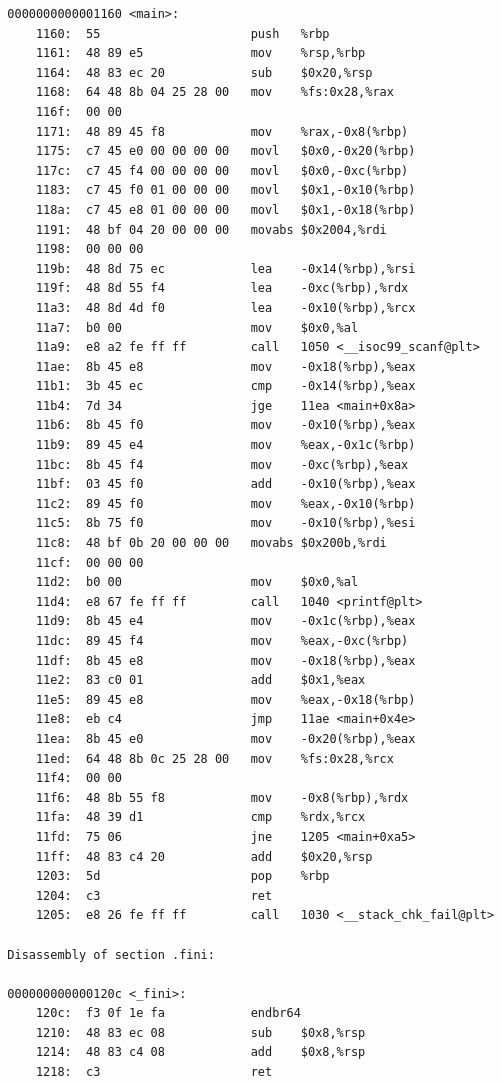 \documentclass[UTF8,a4paper,10pt]{ctexart}
\begin{document}
\begin{verbatim}
  0000000000001160 <main>:
      1160:  55                     push   %rbp
      1161:  48 89 e5               mov    %rsp,%rbp
      1164:  48 83 ec 20            sub    $0x20,%rsp
      1168:  64 48 8b 04 25 28 00   mov    %fs:0x28,%rax
      116f:  00 00 
      1171:  48 89 45 f8            mov    %rax,-0x8(%rbp)
      1175:  c7 45 e0 00 00 00 00   movl   $0x0,-0x20(%rbp)
      117c:  c7 45 f4 00 00 00 00   movl   $0x0,-0xc(%rbp)
      1183:  c7 45 f0 01 00 00 00   movl   $0x1,-0x10(%rbp)
      118a:  c7 45 e8 01 00 00 00   movl   $0x1,-0x18(%rbp)
      1191:  48 bf 04 20 00 00 00   movabs $0x2004,%rdi
      1198:  00 00 00 
      119b:  48 8d 75 ec            lea    -0x14(%rbp),%rsi
      119f:  48 8d 55 f4            lea    -0xc(%rbp),%rdx
      11a3:  48 8d 4d f0            lea    -0x10(%rbp),%rcx
      11a7:  b0 00                  mov    $0x0,%al
      11a9:  e8 a2 fe ff ff         call   1050 <__isoc99_scanf@plt>
      11ae:  8b 45 e8               mov    -0x18(%rbp),%eax
      11b1:  3b 45 ec               cmp    -0x14(%rbp),%eax
      11b4:  7d 34                  jge    11ea <main+0x8a>
      11b6:  8b 45 f0               mov    -0x10(%rbp),%eax
      11b9:  89 45 e4               mov    %eax,-0x1c(%rbp)
      11bc:  8b 45 f4               mov    -0xc(%rbp),%eax
      11bf:  03 45 f0               add    -0x10(%rbp),%eax
      11c2:  89 45 f0               mov    %eax,-0x10(%rbp)
      11c5:  8b 75 f0               mov    -0x10(%rbp),%esi
      11c8:  48 bf 0b 20 00 00 00   movabs $0x200b,%rdi
      11cf:  00 00 00 
      11d2:  b0 00                  mov    $0x0,%al
      11d4:  e8 67 fe ff ff         call   1040 <printf@plt>
      11d9:  8b 45 e4               mov    -0x1c(%rbp),%eax
      11dc:  89 45 f4               mov    %eax,-0xc(%rbp)
      11df:  8b 45 e8               mov    -0x18(%rbp),%eax
      11e2:  83 c0 01               add    $0x1,%eax
      11e5:  89 45 e8               mov    %eax,-0x18(%rbp)
      11e8:  eb c4                  jmp    11ae <main+0x4e>
      11ea:  8b 45 e0               mov    -0x20(%rbp),%eax
      11ed:  64 48 8b 0c 25 28 00   mov    %fs:0x28,%rcx
      11f4:  00 00 
      11f6:  48 8b 55 f8            mov    -0x8(%rbp),%rdx
      11fa:  48 39 d1               cmp    %rdx,%rcx
      11fd:  75 06                  jne    1205 <main+0xa5>
      11ff:  48 83 c4 20            add    $0x20,%rsp
      1203:  5d                     pop    %rbp
      1204:  c3                     ret
      1205:  e8 26 fe ff ff         call   1030 <__stack_chk_fail@plt>
  
  Disassembly of section .fini:
  
  000000000000120c <_fini>:
      120c:  f3 0f 1e fa            endbr64
      1210:  48 83 ec 08            sub    $0x8,%rsp
      1214:  48 83 c4 08            add    $0x8,%rsp
      1218:  c3                     ret
  
\end{verbatim}
\end{document}
